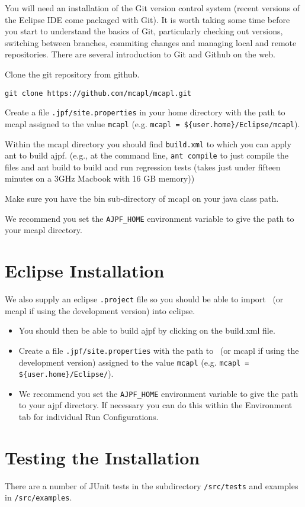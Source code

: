 You will need an installation of the Git version control system (recent versions of the Eclipse IDE come packaged with Git).  It is worth taking some time before you start to understand the basics of Git, particularly checking out versions, switching between branches, commiting changes and managing local and remote repositories.  There are several introduction to Git and Github on the web.

\begin{itemize}
\begin{sloppypar}
\item Clone the git repository from github. 
\begin{small}
\begin{verbatim}
git clone https://github.com/mcapl/mcapl.git
\end{verbatim}
\end{small}
\end{sloppypar}
\item Create a file \texttt{.jpf/site.properties} in your home directory with the path to mcapl assigned to the value \texttt{mcapl} (e.g. \texttt{mcapl = \$\{user.home\}/Eclipse/mcapl}).
\item Within the mcapl directory you should find \texttt{build.xml} to which you can apply ant to build ajpf. (e.g., at the command line, \lstinline{ant compile} to just compile the files and ant build to build and run regression tests (takes just under fifteen minutes on a 3GHz Macbook with 16 GB memory))
\item Make sure you have the bin sub-directory of mcapl on your java class path.
\item We recommend you set the \texttt{AJPF\_HOME} environment variable to give the path to your mcapl directory.
\end{itemize}

\section{Eclipse Installation}

We also supply an eclipse \texttt{.project} file so you should be able to import \ajpfversion\ (or mcapl if using the development version)  into eclipse.
\begin{itemize}
\item You should then be able to build ajpf by clicking on the build.xml file.
\item Create a file \texttt{.jpf/site.properties} with the path to \ajpfversion\ (or mcapl if using the development version)  assigned to the value \texttt{mcapl} (e.g. \texttt{mcapl = \$\{user.home\}/Eclipse/\ajpfversion}).
\item We recommend you set the \texttt{AJPF\_HOME} environment variable to give the path to your ajpf directory.  If necessary you can do this within the Environment tab for individual Run Configurations.
\end{itemize}

\section{Testing the Installation}

There are a number of JUnit tests in the subdirectory \texttt{/src/tests} and examples in \texttt{/src/examples}.

